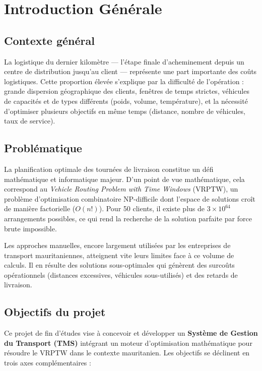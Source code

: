\documentclass[12pt,a4paper]{report}
\begin{document}
\chapter*{Introduction Générale}

\section*{Contexte général}

La logistique du dernier kilomètre — l'étape finale d'acheminement depuis un centre de distribution jusqu'au client — représente une part importante des coûts logistiques. Cette proportion élevée s'explique par la difficulté de l'opération : grande dispersion géographique des clients, fenêtres de temps strictes, véhicules de capacités et de types différents (poids, volume, température), et la nécessité d'optimiser plusieurs objectifs en même temps (distance, nombre de véhicules, taux de service).

\section*{Problématique}

La planification optimale des tournées de livraison constitue un défi mathématique et informatique majeur. D'un point de vue mathématique, cela correspond au \textit{Vehicle Routing Problem with Time Windows} (VRPTW), un problème d'optimisation combinatoire NP-difficile dont l'espace de solutions croît de manière factorielle ($O(n!)$). Pour 50 clients, il existe plus de $3 \times 10^{64}$ arrangements possibles, ce qui rend la recherche de la solution parfaite par force brute impossible.

Les approches manuelles, encore largement utilisées par les entreprises de transport mauritaniennes, atteignent vite leurs limites face à ce volume de calculs. Il en résulte des solutions sous-optimales qui génèrent des surcoûts opérationnels (distances excessives, véhicules sous-utilisés) et des retards de livraison.

\section*{Objectifs du projet}

Ce projet de fin d'études vise à concevoir et développer un \textbf{Système de Gestion du Transport (TMS)} intégrant un moteur d'optimisation mathématique pour résoudre le VRPTW dans le contexte mauritanien. Les objectifs se déclinent en trois axes complémentaires :
\end{document}
